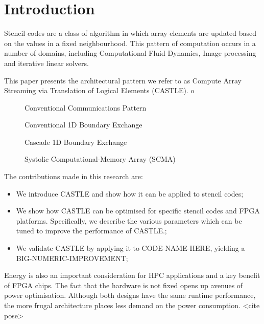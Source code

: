 \section{Introduction}
Stencil codes are a class of algorithm in which array elements are updated based on the values in a fixed neighbourhood.
This pattern of computation occurs in a number of domains, including Computational Fluid Dynamics, Image processing and iterative linear solvers.

This paper presents the architectural pattern we refer to as Compute Array Streaming via Translation of Logical Elements (CASTLE).
o

\begin{figure}
  \centering
  
  \caption{Conventional Communications Pattern}
  \label{fig:convcomms}
\end{figure}

\begin{figure}
  \centering
  
  \caption{Conventional 1D Boundary Exchange}
  \label{fig:exch1dold}
\end{figure}


\begin{figure}
  \centering
  
  \caption{Cascade 1D Boundary Exchange}
  \label{fig:trans1d}
\end{figure}

\begin{figure}
  \centering
  
  \caption{Systolic Computational-Memory Array (SCMA)}
  \label{fig:scma}
\end{figure}

The contributions made in this research are:
\begin{itemize}
  \item{We introduce CASTLE and show how it can be applied to stencil codes;}
  \item{We show how CASTLE can be optimised for specific stencil codes and FPGA platforms.
        Specifically, we describe the various parameters which can be tuned to improve the performance of CASTLE.;}
  \item{We validate CASTLE by applying it to CODE-NAME-HERE, yielding a BIG-NUMERIC-IMPROVEMENT;}
\end{itemize}


Energy is also an important consideration for HPC applications and a key benefit of FPGA chips.
The fact that the hardware is not fixed opens up avenues of power optimisation.
Although both designs have the same runtime performance, the more frugal architecture places less demand on the power consumption.
<cite pose>
